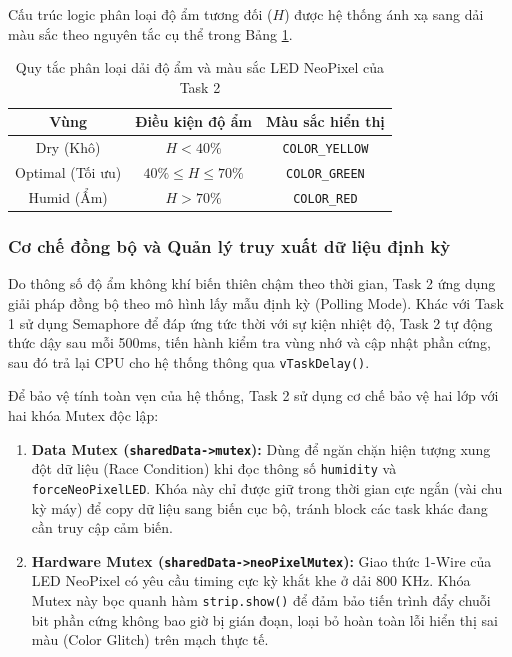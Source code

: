 Cấu trúc logic phân loại độ ẩm tương đối ($H$) được hệ thống ánh xạ sang dải màu sắc theo nguyên tắc cụ thể trong Bảng \ref{tab:task2-logic}.

\begin{table}[h!]
\centering
\caption{Quy tắc phân loại dải độ ẩm và màu sắc LED NeoPixel của Task 2}
\label{tab:task2-logic}
\begin{tabular}{|c|c|c|}
\hline
\textbf{Vùng} & \textbf{Điều kiện độ ẩm} & \textbf{Màu sắc hiển thị} \\
\hline
Dry (Khô) & $H < 40\%$ & \texttt{COLOR\_YELLOW} \\
\hline
Optimal (Tối ưu) & $40\% \leq H \leq 70\%$ & \texttt{COLOR\_GREEN} \\
\hline
Humid (Ẩm) & $H > 70\%$ & \texttt{COLOR\_RED} \\
\hline
\end{tabular}
\end{table}

\subsubsection*{Cơ chế đồng bộ và Quản lý truy xuất dữ liệu định kỳ}

Do thông số độ ẩm không khí biến thiên chậm theo thời gian, Task 2 ứng dụng giải pháp đồng bộ theo mô hình lấy mẫu định kỳ (Polling Mode). Khác với Task 1 sử dụng Semaphore để đáp ứng tức thời với sự kiện nhiệt độ, Task 2 tự động thức dậy sau mỗi 500ms, tiến hành kiểm tra vùng nhớ và cập nhật phần cứng, sau đó trả lại CPU cho hệ thống thông qua \texttt{vTaskDelay()}.

Để bảo vệ tính toàn vẹn của hệ thống, Task 2 sử dụng cơ chế bảo vệ hai lớp với hai khóa Mutex độc lập:
\begin{enumerate}
    \item \textbf{Data Mutex (\texttt{sharedData->mutex}):} Dùng để ngăn chặn hiện tượng xung đột dữ liệu (Race Condition) khi đọc thông số \texttt{humidity} và \texttt{forceNeoPixelLED}. Khóa này chỉ được giữ trong thời gian cực ngắn (vài chu kỳ máy) để copy dữ liệu sang biến cục bộ, tránh block các task khác đang cần truy cập cảm biến.
    \item \textbf{Hardware Mutex (\texttt{sharedData->neoPixelMutex}):} Giao thức 1-Wire của LED NeoPixel có yêu cầu timing cực kỳ khắt khe ở dải 800 KHz. Khóa Mutex này bọc quanh hàm \texttt{strip.show()} để đảm bảo tiến trình đẩy chuỗi bit phần cứng không bao giờ bị gián đoạn, loại bỏ hoàn toàn lỗi hiển thị sai màu (Color Glitch) trên mạch thực tế.
\end{enumerate}

